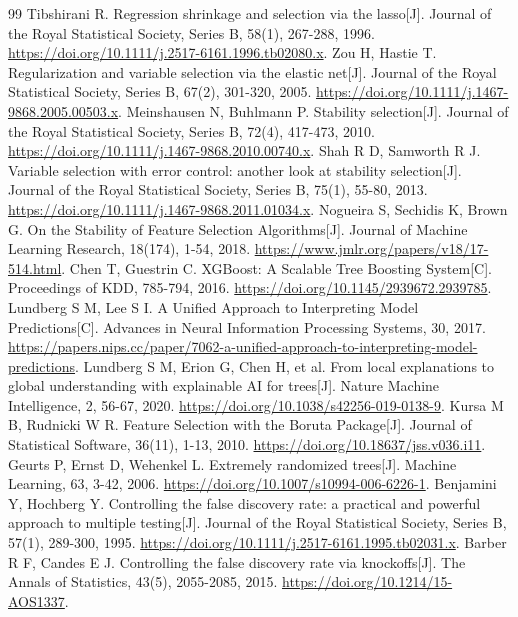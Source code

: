 \documentclass{sufethesismas}
\begin{document}
\backmatter
\begin{thebibliography}{99}
 Tibshirani R. Regression shrinkage and selection via the lasso[J]. Journal of the Royal Statistical Society, Series B, 58(1), 267-288, 1996. \url{https://doi.org/10.1111/j.2517-6161.1996.tb02080.x}.
 Zou H, Hastie T. Regularization and variable selection via the elastic net[J]. Journal of the Royal Statistical Society, Series B, 67(2), 301-320, 2005. \url{https://doi.org/10.1111/j.1467-9868.2005.00503.x}.
 Meinshausen N, Buhlmann P. Stability selection[J]. Journal of the Royal Statistical Society, Series B, 72(4), 417-473, 2010. \url{https://doi.org/10.1111/j.1467-9868.2010.00740.x}.
 Shah R D, Samworth R J. Variable selection with error control: another look at stability selection[J]. Journal of the Royal Statistical Society, Series B, 75(1), 55-80, 2013. \url{https://doi.org/10.1111/j.1467-9868.2011.01034.x}.
 Nogueira S, Sechidis K, Brown G. On the Stability of Feature Selection Algorithms[J]. Journal of Machine Learning Research, 18(174), 1-54, 2018. \url{https://www.jmlr.org/papers/v18/17-514.html}.
 Chen T, Guestrin C. XGBoost: A Scalable Tree Boosting System[C]. Proceedings of KDD, 785-794, 2016. \url{https://doi.org/10.1145/2939672.2939785}.
 Lundberg S M, Lee S I. A Unified Approach to Interpreting Model Predictions[C]. Advances in Neural Information Processing Systems, 30, 2017. \url{https://papers.nips.cc/paper/7062-a-unified-approach-to-interpreting-model-predictions}.
 Lundberg S M, Erion G, Chen H, et al. From local explanations to global understanding with explainable AI for trees[J]. Nature Machine Intelligence, 2, 56-67, 2020. \url{https://doi.org/10.1038/s42256-019-0138-9}.
 Kursa M B, Rudnicki W R. Feature Selection with the Boruta Package[J]. Journal of Statistical Software, 36(11), 1-13, 2010. \url{https://doi.org/10.18637/jss.v036.i11}.
 Geurts P, Ernst D, Wehenkel L. Extremely randomized trees[J]. Machine Learning, 63, 3-42, 2006. \url{https://doi.org/10.1007/s10994-006-6226-1}.
 Benjamini Y, Hochberg Y. Controlling the false discovery rate: a practical and powerful approach to multiple testing[J]. Journal of the Royal Statistical Society, Series B, 57(1), 289-300, 1995. \url{https://doi.org/10.1111/j.2517-6161.1995.tb02031.x}.
 Barber R F, Candes E J. Controlling the false discovery rate via knockoffs[J]. The Annals of Statistics, 43(5), 2055-2085, 2015. \url{https://doi.org/10.1214/15-AOS1337}.

\end{thebibliography}
\end{document}

